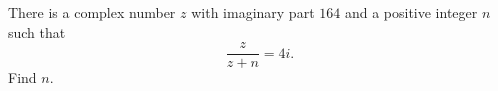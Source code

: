 There is a complex number $ z$ with imaginary part $ 164$ and a positive integer $ n$ such that
\[ \frac {z}{z + n} = 4i.
\]Find $ n$.